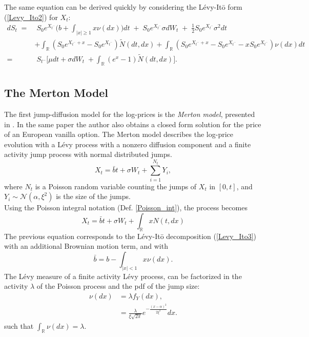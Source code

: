 \documentclass[a4paper,10pt]{article}
\newcommand{\numberset}{\mathbb}
\newcommand{\R}{\numberset{R}}
\begin{document}
The same equation can be derived quickly by considering the Lévy-It\={o} form (\ref{Levy_Ito2}) for $X_t$:
\begin{align*}
 d S_t \; =& \; S_0 e^{X_{t^-}} \biggl( b + \int_{|x|\geq 1}x \nu(dx) \biggr) dt \; + \; S_0 e^{X_{t^-}} \sigma dW_t \; + \; \frac{1}{2}S_0 e^{X_{t^-}}\sigma^2 dt \\ \nonumber
          &+ \int_{\R} (S_0 e^{X_{t^-}+x} - S_0 e^{X_{t^-}}) \tilde N(dt,dx) + \int_{\R} (S_0 e^{X_{t^-}+x} - S_0 e^{X_{t^-}} - x S_0 e^{X_{t^-}}) \nu(dx) dt \\ \nonumber
          =& \; S_{t^-} \biggl[ \mu dt +  \sigma dW_t \; + \int_{\R} (e^{x} - 1) \tilde N(dt,dx) \biggr].\\
\end{align*}




\subsection{The Merton Model}\label{Merton_section}

The first jump-diffusion model for the log-prices is the \emph{Merton model}, presented in 
\cite{Me76}. In the same paper the author also obtains a closed form solution for the price of an European vanilla option. 
The Merton model describes the log-price evolution with a Lévy process with a nonzero diffusion 
component and a finite activity jump process with normal distributed jumps.
\begin{equation}\label{MertonM}
X_t = \bar b t + \sigma W_t + \sum_{i=1}^{N_t} Y_i, 
\end{equation}
where $N_t$ is a Poisson random variable counting the jumps of $X_t$ in $[0,t]$, and $Y_i \sim \mathcal{N}(\alpha, \xi^2)$ is the size of the jumps.\\
Using the Poisson integral notation (Def. \ref{Poisson_int}), the process becomes
\begin{equation*}
 X_t = \bar b t + \sigma W_t + \int_{\R} x N(t,dx)
\end{equation*}
The previous equation corresponds to the Lévy-It\={o} decomposition (\ref{Levy_Ito3}) with an additional Brownian motion term, 
and with
$$\bar b = b - \int_{|x|<1} x \nu(dx).$$
The Lévy measure of a finite activity Lévy process, can be factorized in the activity $\lambda$ of the Poisson process and 
the pdf of the jump size:
\begin{align}\label{Merton_measure}
 \nu(dx) &= \lambda f_Y(dx), \\
	 &= \frac{\lambda}{\xi \sqrt{2\pi}} e^{- \frac{(x-\alpha)^2}{2\xi^2}} dx.  
\end{align}
such that $\int_{\R} \nu(dx) = \lambda$.\\
\end{document}

